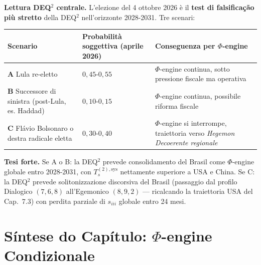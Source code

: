 \Conj{} \textbf{Lettura DEQ$^2$ centrale.} L'elezione del 4 ottobre 2026 è
il \textbf{test di falsificação più stretto} della DEQ$^2$ nell'orizzonte
2028-2031. Tre scenari:

{\def\LTcaptype{none} %
{\small\begin{longtable}[]{@{}
  >{\raggedright\arraybackslash}p{}
  >{\raggedright\arraybackslash}p{}
  >{\raggedright\arraybackslash}p{}@{}}
\toprule\noalign{}
\begin{minipage}[b]{\linewidth}\raggedright
Scenario
\end{minipage} & \begin{minipage}[b]{\linewidth}\raggedright
Probabilità soggettiva (aprile 2026)
\end{minipage} & \begin{minipage}[b]{\linewidth}\raggedright
Conseguenza per \(\Phi\)-engine
\end{minipage} \\
\midrule\noalign{}
\endhead
\bottomrule\noalign{}
\endlastfoot
\textbf{A} Lula re-eletto & \(0{,}45\)-\(0{,}55\) & \(\Phi\)-engine
continua, sotto pressione fiscale ma operativa \\
\textbf{B} Successore di sinistra (post-Lula, es. Haddad) &
\(0{,}10\)-\(0{,}15\) & \(\Phi\)-engine continua, possibile riforma
fiscale \\
\textbf{C} Flávio Bolsonaro o destra radicale eletta &
\(0{,}30\)-\(0{,}40\) & \(\Phi\)-engine si interrompe, traiettoria verso
\emph{Hegemon Decoerente regionale} \\
\end{longtable}}
}

\Hypoth{} \textbf{Tesi forte.} Se A o B: la DEQ$^2$ prevede consolidamento
del Brasil come \(\Phi\)-engine globale entro 2028-2031, con
\(T_s^{(2),\text{sys}}\) nettamente superiore a USA e China. Se C: la
DEQ$^2$ prevede solitonizzazione discorsiva del Brasil (passaggio dal
profilo Dialogico \((7,6,8)\) all'Egemonico \((8,9,2)\) --- ricalcando
la traiettoria USA del Cap.~7.3) con perdita parziale di \(s_{iii}\)
globale entro 24 mesi.



\section{\texorpdfstring{Síntese do Capítulo: \(\Phi\)-engine
Condizionale}{Síntese do Capítulo: \textbackslash Phi-engine Condizionale}}\label{sintesi-del-capítulo-phi-engine-condicional}

